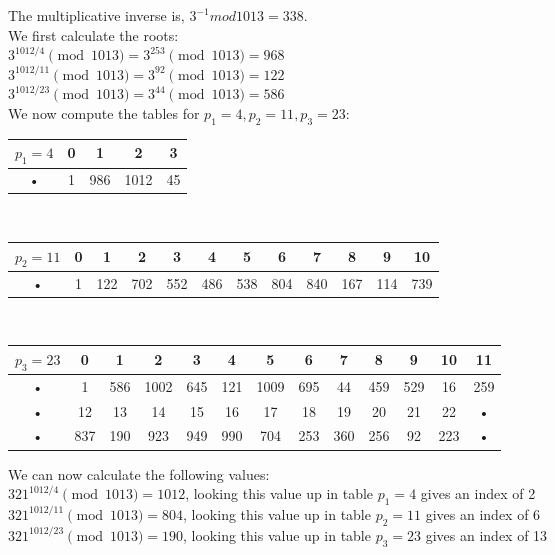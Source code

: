 \documentclass{article}
\begin{document}
The multiplicative inverse is, $3^{-1} mod 1013 = 338$.\\
We first calculate the roots:\\
$3^{1012/4} \pmod{1013} = 3^{253} \pmod{1013} = 968$\\
$3^{1012/11} \pmod{1013} = 3^{92} \pmod{1013} = 122$\\
$3^{1012/23} \pmod{1013} = 3^{44} \pmod{1013} = 586$\\

We now compute the tables for $p_{1} = 4, p_{2} = 11, p_{3} = 23$: \\

\begin{tabular}{|c|c|c|c|c|}
\hline 
 $p_{1} = 4$ & 0 & 1 & 2 & 3 \\ 
\hline 
• & 1 & 986 & 1012 & 45 \\ 
\hline 
\end{tabular}\\ 

\begin{tabular}{|c|c|c|c|c|c|c|c|c|c|c|c|}
\hline 
$p_{2} = 11$ & 0 & 1 & 2 & 3 & 4 & 5 & 6 & 7 & 8 & 9 & 10 \\ 
\hline 
• & 1 & 122 & 702 & 552 & 486 & 538 & 804 & 840 & 167 & 114 & 739 \\ 
\hline 
\end{tabular}\\

\begin{tabular}{|c|c|c|c|c|c|c|c|c|c|c|c|c|}
\hline 
$p_{3} = 23$ & 0 & 1 & 2 & 3 & 4 & 5 & 6 & 7 & 8 & 9 & 10 & 11 \\ 
\hline 
• & 1 & 586 & 1002 & 645 & 121 & 1009 & 695 & 44 & 459 & 529 & 16 & 259 \\ 
\hline 
• & 12 & 13 & 14 & 15 & 16 & 17 & 18 & 19 & 20 & 21 & 22 & • \\ 
\hline 
• & 837 & 190 & 923 & 949 & 990 & 704 & 253 & 360 & 256 & 92 & 223 & • \\ 
\hline 
\end{tabular}

\noindent
We can now calculate the following values:\\
$321^{1012/4} \pmod 1013 = 1012$, looking this value up in table $p_{1} = 4$ gives an index of 2\\
$321^{1012/11} \pmod 1013 = 804$, looking this value up in table $p_{2} = 11$ gives an index of 6\\
$321^{1012/23} \pmod 1013 = 190$, looking this value up in table $p_{3} = 23$ gives an index of 13\\
\end{document}
